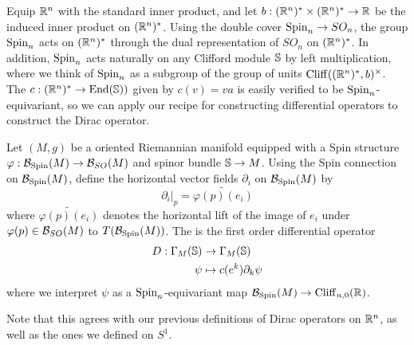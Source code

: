 Equip $\R^n$ with the standard inner product, and let
$b :(\R^n)^* \times (\R^n)^* \to \R$ be the induced inner product on $(\R^n)^*$.
Using the double cover $\Spin_n \to SO_n$, the group $\Spin_n$ acts on
$(\R^n)^*$ through the dual representation of $SO_n$ on $(\R^n)^*$. In addition,
$\Spin_n$ acts naturally on any Clifford module $\S$ by left multiplication, where
we think of $\Spin_n$ as a subgroup of the group of units
$\Cliff((\R^n)^*, b)^\times$. The 
$c : (\R^n)^* \to \End(\S))$ given by $c(v) = va$ is easily
verified to be $\Spin_n$-equivariant, so we can apply our recipe for
constructing differential operators to construct the Dirac operator.
%
\begin{defn}
 Let $(M,g)$ be a oriented Riemannian manifold equipped with a Spin structure
 $\varphi : \B_{\Spin}(M) \to \B_{SO}(M)$ and spinor bundle $\S \to M$.
 Using the Spin connection on $\B_{\Spin}(M)$, define the horizontal
 vector fields $\partial_i$ on $\B_{\Spin}(M)$ by
 \[
  \partial_i\vert_p = \widetilde{\varphi(p)(e_i)}
 \]
 where $\widetilde{\varphi(p)(e_i)}$ denotes the horizontal lift of the
 image of $e_i$ under $\varphi(p) \in \B_{SO}(M)$ to $T(\B_{\Spin}(M))$.
 The  is the first order differential operator
 \begin{align*}
  D : \Gamma_M(\S) & \to \Gamma_M(\S)          \\
  \psi                & \mapsto c(e^k)\partial_k\psi
 \end{align*}
 where we interpret $\psi$ as a $\Spin_n$-equivariant map
 $\B_{\Spin}(M) \to \Cliff_{n,0}(\R)$.
\end{defn}
Note that this agrees with our previous definitions of Dirac operators on $\R^n$,
as well as the ones we defined on $S^1$. \\
%

